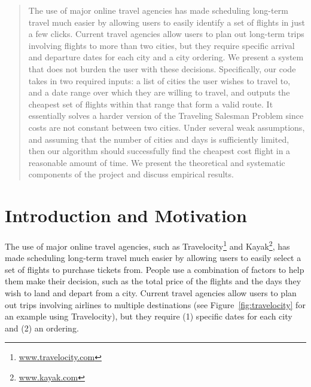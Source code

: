 \documentclass{article}
\begin{document}
 


\begin{abstract} 
The use of major online travel agencies has made scheduling long-term travel much easier by allowing users to easily identify a set of flights in just
a few clicks. Current travel agencies allow users to plan out long-term trips involving flights to more than two cities, but they require specific
arrival and departure dates for each city and a city ordering. We present a system that does not burden the user with these decisions. Specifically,
our code takes in two required inputs: a list of cities the user wishes to travel to, and a date range over which they are willing to travel, and
outputs the cheapest set of flights within that range that form a valid route. It essentially solves a harder version of the Traveling Salesman
Problem since costs are not constant between two cities. Under several weak assumptions, and assuming that the number of cities and days is
sufficiently limited, then our algorithm should successfully find the cheapest cost flight in a reasonable amount of time. We present the theoretical
and systematic components of the project and discuss empirical results.
\end{abstract} 

\section{Introduction and Motivation}\label{sec:intro}

The use of major online travel agencies, such as Travelocity\footnote{\url{www.travelocity.com}} and Kayak\footnote{\url{www.kayak.com}}, has made
scheduling long-term travel much easier by allowing users to easily select a set of flights to purchase tickets from. People use a combination of
factors to help them make their decision, such as the total price of the flights and the days they wish to land and depart from a city. Current travel
agencies allow users to plan out trips involving airlines to multiple destinations (see Figure~\ref{fig:travelocity} for an example using
Travelocity), but they require (1) specific dates for each city and (2) an ordering.
\end{document}
